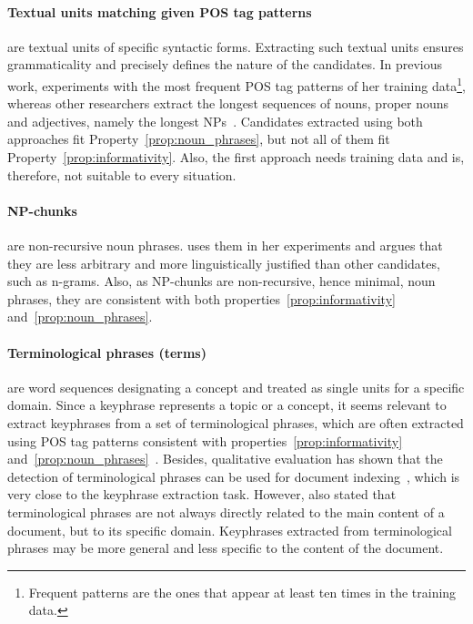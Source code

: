   \paragraph{Textual units matching given POS tag patterns} are textual units of
  specific syntactic forms. Extracting such textual units ensures grammaticality
  and precisely defines the nature of the candidates. In previous work,
   experiments with the most frequent POS
  tag patterns of her training data\footnote{Frequent patterns are the ones that
  appear at least ten times in the training data.}, whereas other researchers
  extract the longest sequences of nouns, proper nouns and adjectives, namely
  the longest NPs~\cite{hassan2010conundrums}. Candidates extracted using both
  approaches fit Property~\ref{prop:noun_phrases}, but not all of them fit
  Property~\ref{prop:informativity}. Also, the first approach needs training
  data and is, therefore, not suitable to every situation.

  \paragraph{NP-chunks} are non-recursive noun phrases.
   uses them in her experiments and argues
  that they are less arbitrary and more linguistically justified than other
  candidates, such as n-grams. Also, as NP-chunks are non-recursive, hence
  minimal, noun phrases, they are consistent with both
  properties~\ref{prop:informativity} and~\ref{prop:noun_phrases}.

  \paragraph{Terminological phrases (terms)} are word sequences designating a
  concept and treated as single units for a specific domain. Since a keyphrase
  represents a topic or a concept, it seems relevant to extract
  keyphrases from  a set of terminological phrases, which are often extracted
  using POS tag patterns consistent with properties~\ref{prop:informativity}
  and~\ref{prop:noun_phrases}~\cite{castellvi2001automatictermdetection}.
  Besides, qualitative evaluation has shown that the detection of terminological
  phrases can be used for document
  indexing~\cite{witschel2005terminologyextractionandautomaticindexing}, which
  is very close to the keyphrase extraction task. However,
   also stated
  that terminological phrases are not always directly related to the main
  content of a document, but to its specific domain. Keyphrases extracted from
  terminological phrases may be more general and less specific to the content of
  the document.

